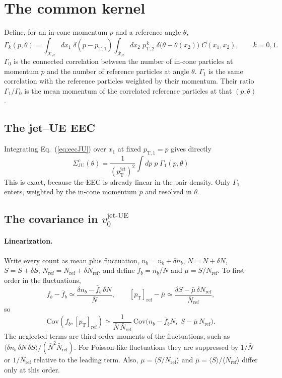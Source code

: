 \documentclass[11pt,a4paper]{article}
\newcommand{\pT}{p_\mathrm{T}}
\newcommand{\vjet}{v_0^{\mathrm{jet\text{-}UE}}}
\newcommand{\mpt}{[\pT]_\mathrm{ref}}
\newcommand{\K}{\mathcal{K}_R}
\newcommand{\Rr}{\mathcal{R}_R}
\newcommand{\Nref}{N_\mathrm{ref}}
\newcommand{\pjet}{p_\mathrm{T}^\mathrm{jet}}
\begin{document}
\section{The common kernel}
\label{sec:kernel}

Define, for an in-cone momentum $p$ and a reference angle $\theta$,
\begin{equation}
\Gamma_k(p,\theta)=\int_{\K}\!dx_1\;\delta(p-p_{\mathrm{T},1})\int_{\Rr}\!dx_2\;p_{\mathrm{T},2}^{\,k}\;\delta\big(\theta-\theta(x_2)\big)\;C(x_1,x_2),\qquad k=0,1 .
\label{eq:gamma}
\end{equation}
$\Gamma_0$ is the connected correlation between the number of in-cone particles at momentum $p$ and the number of reference particles at angle $\theta$. $\Gamma_1$ is the same correlation with the reference particles weighted by their momentum. Their ratio $\Gamma_1/\Gamma_0$ is the mean momentum of the correlated reference particles at that $(p,\theta)$.

\subsection{The jet--UE EEC}
Integrating Eq.~(\ref{eq:eecJU}) over $x_1$ at fixed $p_{\mathrm{T},1}=p$ gives directly
\begin{equation}
\boxed{\;\Sigma^{c}_\mathrm{JU}(\theta)=\frac{1}{(\pjet)^2}\int\!dp\;p\;\Gamma_1(p,\theta)\;}
\label{eq:eec_gamma}
\end{equation}
This is exact, because the EEC is already linear in the pair density. Only $\Gamma_1$ enters, weighted by the in-cone momentum $p$ and resolved in $\theta$.

\subsection{The covariance in $\vjet$}
\paragraph{Linearization.}
Write every count as mean plus fluctuation, $n_b=\bar n_b+\delta n_b$, $N=\bar N+\delta N$, $S=\bar S+\delta S$, $\Nref=\bar N_\mathrm{ref}+\delta\Nref$, and define $\bar f_b=\bar n_b/\bar N$ and $\bar\mu=\bar S/\bar N_\mathrm{ref}$. To first order in the fluctuations,
\begin{equation}
f_b-\bar f_b\simeq\frac{\delta n_b-\bar f_b\,\delta N}{\bar N},\qquad
\mpt-\bar\mu\simeq\frac{\delta S-\bar\mu\,\delta\Nref}{\bar N_\mathrm{ref}},
\end{equation}
so
\begin{equation}
\mathrm{Cov}(f_b,\mpt)\simeq\frac{1}{\bar N\,\bar N_\mathrm{ref}}\,
\mathrm{Cov}\Big(n_b-\bar f_b N,\;S-\bar\mu\,\Nref\Big).
\label{eq:lin}
\end{equation}
The neglected terms are third-order moments of the fluctuations, such as $\langle\delta n_b\,\delta N\,\delta S\rangle/(\bar N^2\bar N_\mathrm{ref})$. For Poisson-like fluctuations they are suppressed by $1/\bar N$ or $1/\bar N_\mathrm{ref}$ relative to the leading term. Also, $\mu=\langle S/\Nref\rangle$ and $\bar\mu=\langle S\rangle/\langle\Nref\rangle$ differ only at this order.
\end{document}
